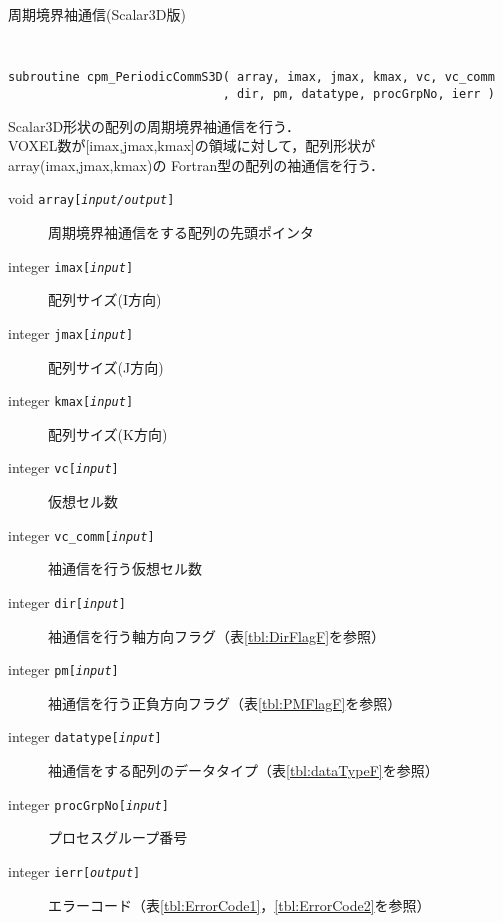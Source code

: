 \begin{spacing}{0.8}
\begin{itembox}[l]{周期境界袖通信(Scalar3D版)}
{\tt
\begin{verbatim}
subroutine cpm_PeriodicCommS3D( array, imax, jmax, kmax, vc, vc_comm
                              , dir, pm, datatype, procGrpNo, ierr )
\end{verbatim}
}
Scalar3D形状の配列の周期境界袖通信を行う．\\
VOXEL数が[imax,jmax,kmax]の領域に対して，配列形状がarray(imax,jmax,kmax)の
Fortran型の配列の袖通信を行う．
\begin{description}
\item[void    {\tt array[{\it input/output}]}] 周期境界袖通信をする配列の先頭ポインタ
\item[integer {\tt imax[{\it input}]}] 配列サイズ(I方向)
\item[integer {\tt jmax[{\it input}]}] 配列サイズ(J方向)
\item[integer {\tt kmax[{\it input}]}] 配列サイズ(K方向)
\item[integer {\tt vc[{\it input}]}] 仮想セル数
\item[integer {\tt vc\_comm[{\it input}]}] 袖通信を行う仮想セル数
\item[integer {\tt dir[{\it input}]}] 袖通信を行う軸方向フラグ（表\ref{tbl:DirFlagF}を参照）
\item[integer {\tt pm[{\it input}]}] 袖通信を行う正負方向フラグ（表\ref{tbl:PMFlagF}を参照）
\item[integer {\tt datatype[{\it input}]}] 袖通信をする配列のデータタイプ（表\ref{tbl:dataTypeF}を参照）
\item[integer {\tt procGrpNo[{\it input}]}] プロセスグループ番号
\item[integer {\tt ierr[{\it output}]}] エラーコード（表\ref{tbl:ErrorCode1}，\ref{tbl:ErrorCode2}を参照）
\end{description}
\end{itembox}\\
\end{spacing}

